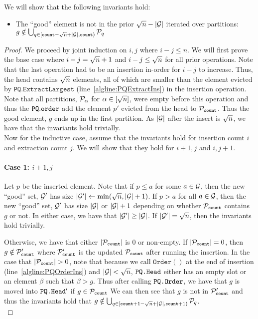 We will show that the following invariants hold:
\begin{itemize}
	\item The ``good'' element is not in the prior ${\sqrt{n}} - |\mathcal{G}|$ iterated over partitions: $g \notin \bigcup_{q \in [{\texttt{count}} - {\sqrt{n}} + |\mathcal{G}|, {\texttt{count}})} \mathcal{P}_q$
\end{itemize}

\begin{proof}
We proceed by joint induction on $i, j$ where $i - j \leq n$. 
We will first prove the base case where $i - j = {\sqrt{n}} + 1$ and $i - j \leq {\sqrt{n}}$ for all prior operations.
Note that the last operation had to be an insertion in-order for $i - j$ to increase. Thus, the head contains ${\sqrt{n}}$ elements, all of which are smaller than the element evicted by $\texttt{PQ.ExtractLargest}$ (line~\ref{algline:PQExtractIns}) in the insertion operation.
Note that all partitions, $\mathcal{P}_\alpha$ for $\alpha \in [{\sqrt{n}}]$, were empty before this operation and thus the $\texttt{PQ}.\texttt{order}$
add the element $p'$ evicted from the head to $\mathcal{P}_{\texttt{count}}$. Thus the good element, $g$ ends up in the first partition.
As $|\mathcal{G}|$ after the insert is ${\sqrt{n}}$, we have that the invariants hold trivially.\\


Now for the inductive case, assume that the invariants hold for insertion count $i$ and extraction count $j$. We will show that they hold for $i + 1, j$ and $i, j + 1$.
\paragraph*{Case 1: $i + 1, j$}
\label{proof:case1}
Let $p$ be the inserted element. Note that if $p \leq a$ for some $a \in \mathcal{G}$, then the new ``good'' set, 
$\mathcal{G}'$ has size $|\mathcal{G}'| \gets \min({\sqrt{n}}, |\mathcal{G}| + 1)$. If $p > a$ for all $a \in \mathcal{G}$, then the new ``good'' set, $\mathcal{G}'$ has size $|\mathcal{G}|$ or  $|\mathcal{G}| + 1$ depending on whether $\mathcal{P}_{\texttt{count}}$ contains $g$ or not.
In either case, we have that $|\mathcal{G}'| \geq |\mathcal{G}|$. If $|\mathcal{G}'| = {\sqrt{n}}$, then the invariants hold trivially.

Otherwise, we have that either $|\mathcal{P}_{\texttt{count}}|$ is $0$ or non-empty. If  $|\mathcal{P}_{\texttt{count}}| = 0$, then $g \notin \mathcal{P}'_{\texttt{count}}$ where $\mathcal{P}'_{\texttt{count}}$ is the updated $\mathcal{P}_{\texttt{count}}$ after running the insertion.
In the case that $|\mathcal{P}_{\texttt{count}}| > 0$, note that because we call $\texttt{Order}()$ at the end of insertion (line~\ref{algline:PQOrderIns}) and $|\mathcal{G}| < {\sqrt{n}}$,
$\texttt{PQ.Head}$ either has an empty slot or an element $\beta$ such that $\beta > g$. Thus after calling $\texttt{PQ.Order}$, we have that $g$ is moved into $\texttt{PQ.Head}'$ if $g \in \mathcal{P}_{\texttt{count}}$
We can then see that $g$ is not in $\mathcal{P}'_{\texttt{count}}$ and thus the invariants hold
that $g \notin \bigcup_{q \in [{\texttt{count}} + 1 - {\sqrt{n}} + |\mathcal{G}|, {\texttt{count}} + 1)} \mathcal{P}_q$.\\


\end{proof}
